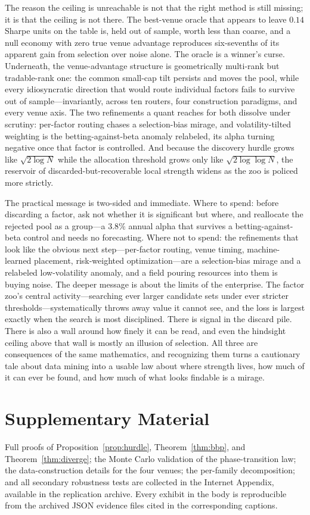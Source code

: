 \documentclass[12pt]{article}
\theoremstyle{plain}
\theoremstyle{definition}
\begin{document}
The reason the ceiling is unreachable is not that the right method is still
missing; it is that the ceiling is not there. The best-venue oracle that appears
to leave $0.14$ Sharpe units on the table is, held out of sample, worth less than
coarse, and a null economy with zero true venue advantage reproduces six-sevenths
of its apparent gain from selection over noise alone. The oracle is a winner's
curse. Underneath, the venue-advantage structure is geometrically multi-rank but
tradable-rank one: the common small-cap tilt persists and moves the pool, while
every idiosyncratic direction that would route individual factors fails to
survive out of sample---invariantly, across ten routers, four construction
paradigms, and every venue axis. The two refinements a quant reaches for both
dissolve under scrutiny: per-factor routing chases a selection-bias mirage, and
volatility-tilted weighting is the betting-against-beta anomaly relabeled, its
alpha turning negative once that factor is controlled. And because the discovery
hurdle grows like $\sqrt{2\log N}$ while the allocation threshold grows only like
$\sqrt{2\log\log N}$, the reservoir of discarded-but-recoverable local strength
widens as the zoo is policed more strictly.

The practical message is two-sided and immediate. Where to spend: before
discarding a factor, ask not whether it is significant but where, and reallocate
the rejected pool as a group---a $3.8\%$ annual alpha that survives a
betting-against-beta control and needs no forecasting. Where not to spend: the
refinements that look like the obvious next step---per-factor routing, venue
timing, machine-learned placement, risk-weighted optimization---are a
selection-bias mirage and a relabeled low-volatility anomaly, and a field
pouring resources into them is buying noise. The deeper message is about the
limits of the enterprise. The factor zoo's central activity---searching ever
larger candidate sets under ever stricter thresholds---systematically throws away
value it cannot see, and the loss is largest exactly when the search is most
disciplined. There is signal in the discard pile. There is also a wall around how
finely it can be read, and even the hindsight ceiling above that wall is mostly
an illusion of selection. All three are consequences of the same mathematics, and
recognizing them turns a cautionary tale about data mining into a usable law
about where strength lives, how much of it can ever be found, and how much of
what looks findable is a mirage.

\clearpage
\appendix
\section{Supplementary Material}
\label{app:supp}

Full proofs of Proposition~\ref{prop:hurdle}, Theorem~\ref{thm:bbp}, and
Theorem~\ref{thm:diverge}; the Monte Carlo validation of the phase-transition
law; the data-construction details for the four venues; the per-family
decomposition; and all secondary robustness tests are collected in the Internet
Appendix, available in the replication archive. Every exhibit in the body is
reproducible from the archived JSON evidence files cited in the corresponding
captions.

\clearpage

\end{document}
